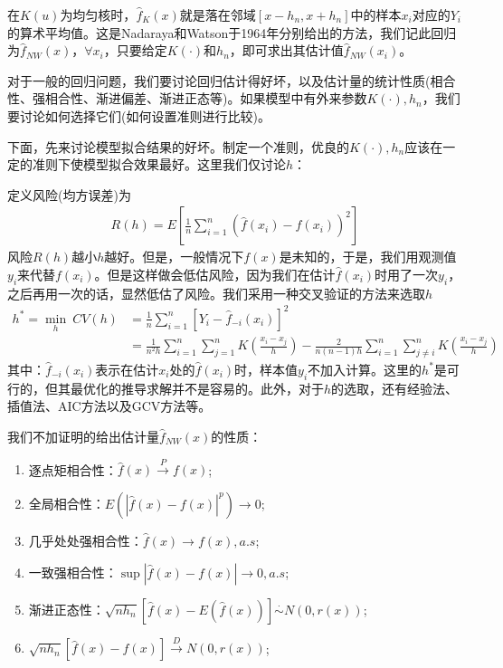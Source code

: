             在$K(u)$为均匀核时，$\hat{f}_K(x)$就是落在邻域$[x-h_n,x+h_n]$中的样本$x_i$对应的$Y_i$的算术平均值。这是Nadaraya和Watson于1964年分别给出的方法，我们记此回归为$\hat{f}_{NW}(x)$，$\forall x_i$，只要给定$K(\cdot)$和$h_n$，即可求出其估计值$\hat{f}_{NW}(x_i)$。
            \par
            对于一般的回归问题，我们要讨论回归估计得好坏，以及估计量的统计性质(相合性、强相合性、渐进偏差、渐进正态等)。如果模型中有外来参数$K(\cdot),h_n$，我们要讨论如何选择它们(如何设置准则进行比较)。
            \par
            下面，先来讨论模型拟合结果的好坏。制定一个准则，优良的$K(\cdot),h_n$应该在一定的准则下使模型拟合效果最好。这里我们仅讨论$h$：
            \par
            定义风险(均方误差)为
            \begin{align*}
            R(h) = E\left[ \frac{1}{n} \sum_{i=1}^n(\hat{f}(x_i) - f(x_i))^2  \right]
            \end{align*}
            风险$R(h)$越小$h$越好。但是，一般情况下$f(x)$是未知的，于是，我们用观测值$y_i$来代替$f(x_i)$。但是这样做会低估风险，因为我们在估计$\hat{f}(x_i)$时用了一次$y_i$，之后再用一次的话，显然低估了风险。我们采用一种交叉验证的方法来选取$h$
            \begin{align*}
            h^* = \min_h \ CV(h) &= \frac{1}{n}\sum_{i=1}^n[Y_i - \hat{f}_{-i}(x_i)]^2\\
            &= \frac{1}{n^2h} \sum_{i=1}^n\sum_{j=1}^n K \left( \frac{x_i - x_j}{h} \right) - \frac{2}{n(n-1)h}\sum_{i=1}^n\sum_{j \neq i}^nK\left( \frac{x_i - x_j}{h} \right)
            \end{align*}
            其中：$\hat{f}_{-i}(x_i)$表示在估计$x_i$处的$\hat{f}(x_i)$时，样本值$y_i$不加入计算。这里的$h^*$是可行的，但其最优化的推导求解并不是容易的。此外，对于$h$的选取，还有经验法、插值法、AIC方法以及GCV方法等。
            \par
            我们不加证明的给出估计量$\hat{f}_{NW}(x)$的性质：
            \begin{enumerate}
            \item 逐点矩相合性：$\hat{f}(x)\xrightarrow{P}f(x)$;
            \item 全局相合性：$E(|\hat{f}(x) - f(x)|^p)\rightarrow 0$;
            \item 几乎处处强相合性：$\hat{f}(x)\rightarrow f(x),a.s$;
            \item 一致强相合性：$\sup |\hat{f}(x) - f(x)| \rightarrow 0,a.s$;
            \item 渐进正态性：$\sqrt{nh_n} [\hat{f}(x) - E(\hat{f}(x))]\overset{\cdot}{\sim} N(0,r(x))$;
            \item $\sqrt{nh_n} [\hat{f}(x) - {f}(x)]\xrightarrow{D}N(0,r(x))$;
            \end{enumerate}

